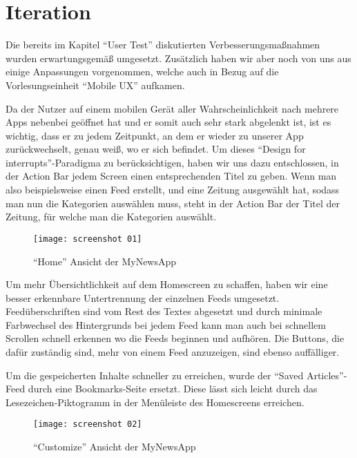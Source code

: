 
\section{Iteration}

Die bereits im Kapitel \enquote{User Test} diskutierten Verbesserungsmaßnahmen wurden erwartungsgemäß umgesetzt.
Zusätzlich haben wir aber noch von uns aus einige Anpassungen vorgenommen, welche auch in Bezug auf die Vorlesungseinheit \enquote{Mobile UX} aufkamen.

Da der Nutzer auf einem mobilen Gerät aller Wahrscheinlichkeit nach mehrere Apps nebenbei geöffnet hat und er somit auch sehr stark abgelenkt ist, ist es wichtig, dass er zu jedem Zeitpunkt, an dem er wieder zu unserer App zurückwechselt, genau weiß, wo er sich befindet. Um dieses \enquote{Design for interrupts}-Paradigma zu berücksichtigen, haben wir uns dazu entschlossen, in der Action Bar jedem Screen einen entsprechenden Titel zu geben. Wenn man also beispielsweise einen Feed erstellt, und eine Zeitung ausgewählt hat, sodass man nun die Kategorien auswählen muss, steht in der Action Bar der Titel der Zeitung, für welche man die Kategorien auswählt.

\begin{wrapfigure}{R}{0.45\textwidth}
  \centering
  \texttt{[image: screenshot 01]}
  \caption{\enquote{Home} Ansicht der MyNewsApp}
  \label{fig:screenshot-01}
\end{wrapfigure}

Um mehr Übersichtlichkeit auf dem Homescreen zu schaffen, haben wir eine besser erkennbare Untertrennung der einzelnen Feeds umgesetzt. Feedüberschriften sind vom Rest des Textes abgesetzt und durch minimale Farbwechsel des Hintergrunds bei jedem Feed kann man auch bei schnellem Scrollen schnell erkennen wo die Feeds beginnen und aufhören. Die Buttons, die dafür zuständig sind, mehr von einem Feed anzuzeigen, sind ebenso auffälliger.

Um die gespeicherten Inhalte schneller zu erreichen, wurde der \enquote{Saved Articles}-Feed durch eine Bookmarks-Seite ersetzt. Diese lässt sich leicht durch das Lesezeichen-Piktogramm in der Menüleiste des Homescreens erreichen.

\clearpage

\begin{wrapfigure}{L}{0.45\textwidth}
  \centering
  \texttt{[image: screenshot 02]}
  \caption{\enquote{Customize} Ansicht der MyNewsApp}
  \label{fig:screenshot-02}
\end{wrapfigure}

